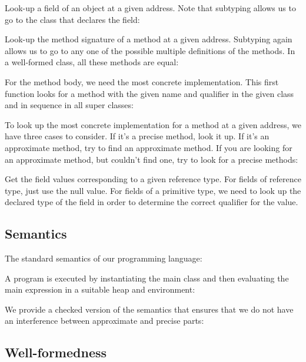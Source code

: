 Look-up a field of an object at a given address.
Note that subtyping allows us to go to the class that declares the
field:

\ottdefnrftype


Look-up the method signature of a method at a given address.
Subtyping again allows us to go to any one of the possible multiple
definitions of the methods. In a well-formed class, all these methods
are equal:

\ottdefnrmsign


For the method body, we need the most concrete implementation.
This first function looks for a method with the given name and
qualifier in the given class and in sequence in all super classes:

\ottdefnsmbodyc


To look up the most concrete implementation for a method at a given
address, we have three cases to consider.
If it's a precise method, look it up.
If it's an approximate method, try to find an approximate method.
If you are looking for an approximate method, but couldn't find one,
try to look for a precise methods:

\ottdefnrmbody


Get the field values corresponding to a given reference type.
For fields of reference type, just use the null value.
For fields of a primitive type, we need to look up the declared type
of the field in order to determine the correct qualifier for the
value.

\ottdefnfvsinit


\subsection{Semantics}

The standard semantics of our programming language:

\ottdefnsemantics


A program is executed by instantiating the main class and then
evaluating the main expression in a suitable heap and environment:

\ottdefnsemanticsXXprg


We provide a checked version of the semantics that ensures that we do
not have an interference between approximate and precise parts:

\ottdefncheckedsemantics


\subsection{Well-formedness}

